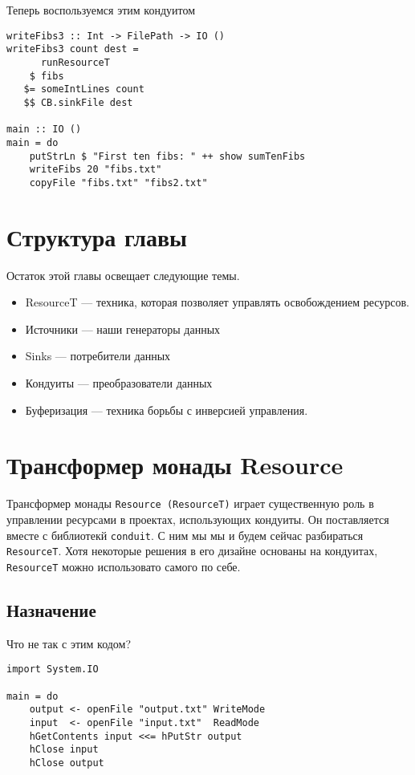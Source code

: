 Теперь воспользуемся этим кондуитом
\begin{lstlisting}
writeFibs3 :: Int -> FilePath -> IO ()
writeFibs3 count dest =
      runResourceT
    $ fibs
   $= someIntLines count
   $$ CB.sinkFile dest

main :: IO ()
main = do
    putStrLn $ "First ten fibs: " ++ show sumTenFibs
    writeFibs 20 "fibs.txt"
    copyFile "fibs.txt" "fibs2.txt"
\end{lstlisting}

\section{Структура главы}

Остаток этой главы освещает следующие темы.
\begin{itemize}
 \item ResourceT --- техника, которая позволяет управлять освобождением ресурсов.
 \item Источники --- наши генераторы данных
 \item Sinks --- потребители данных
 \item Кондуиты --- преобразователи данных
 \item Буферизация --- техника борьбы с инверсией управления.
\end{itemize}

\section{Трансформер монады Resource}

Трансформер монады \verb*|Resource (ResourceT)| играет существенную роль в управлении
ресурсами в
проектах, использующих кондуиты. Он поставляется вместе с библиотекй \verb=conduit=. 
С ним мы мы и будем сейчас  разбираться \verb*|ResourceT|. Хотя некоторые решения в его дизайне
основаны на кондуитах, \verb*|ResourceT| можно использовато самого по себе.

\subsection{Назначение}
Что не так с этим кодом?
\begin{lstlisting}
import System.IO

main = do
    output <- openFile "output.txt" WriteMode
    input  <- openFile "input.txt"  ReadMode
    hGetContents input <<= hPutStr output
    hClose input
    hClose output
\end{lstlisting}

